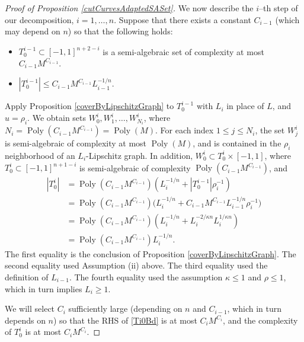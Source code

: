 \documentclass[letterpaper, reqno,11pt]{article}
\numberwithin{equation}{section}
\newcommand{\poly}{\operatorname{Poly}}
\numberwithin{thm}{section}
\theoremstyle{remark}
\begin{document}
\begin{proof}[Proof of Proposition \ref{cutCurvesAdaptedSASet}]
We now describe the $i$--th step of our decomposition, $i=1,\ldots,n$. Suppose that there exists a constant $C_{i-1}$ (which may depend on $n$) so that the following holds:
\begin{itemize}
	\item[(i)] $T^{i-1}_0\subset[-1,1]^{n+2-i}$ is a semi-algebraic set of complexity at most $C_{i-1}M^{C_{i-1}}$.
	\item[(ii)] $|T^{i-1}_0| \leq C_{i-1}M^{C_{i-1}}L_{i-1}^{-1/n}$.
\end{itemize}
Apply Proposition \ref{coverByLipschitzGraph} to $T^{i-1}_0$ with $L_i$ in place of $L$, and $u=\rho_i$. We obtain sets $W^i_0, W^{i}_1,\ldots, W^{i}_{N_i}$, where $N_i = \poly(C_{i-1}M^{C_{i-1}})=\poly(M)$. For each index $1\leq j\leq N_i$, the set $W^i_j$ is semi-algebraic of complexity at most $\poly(M)$, and is contained in the $\rho_i$ neighborhood of an $L_i$-Lipschitz graph. In addition, $W^i_0 \subset T^i_0\times[-1,1]$, where $T^i_0\subset[-1,1]^{n+1-i}$ is semi-algebraic of complexity $\poly(C_{i-1}M^{C_{i-1}})$, and  
\begin{equation}\label{Ti0Bd}
\begin{split}
|T^i_0| & = \poly(C_{i-1}M^{C_{i-1}})(L_i^{-1/n}+|T^{i-1}_0| \rho_i^{-1})\\
& =  \poly(C_{i-1}M^{C_{i-1}})\big(L_i^{-1/n}+C_{i-1}M^{C_{i-1}}L_{i-1}^{-1/n}\rho_i^{-1}\big)\\
&=\poly(C_{i-1}M^{C_{i-1}})(L_i^{-1/n}+L_i^{-2/\kappa n}L_i^{1/\kappa n}) \\
& =\poly(C_{i-1}M^{C_{i-1}}) L_i^{-1/n}.
\end{split}
\end{equation}
The first equality is the conclusion of Proposition \ref{coverByLipschitzGraph}. The second equality used Assumption (ii) above. The third equality used the definition of $L_{i-1}$. The fourth equality used the assumption $\kappa\leq 1$ and $\rho\leq 1$, which in turn implies $L_i\geq 1$. 

We will select $C_{i}$ sufficiently large (depending on $n$ and $C_{i-1}$, which in turn depends on $n$) so that the RHS of \eqref{Ti0Bd} is at most $C_i M^{C_i}$, and the complexity of $T^i_0$ is at most $C_i M^{C_i}$.


\end{proof}
\end{document}
